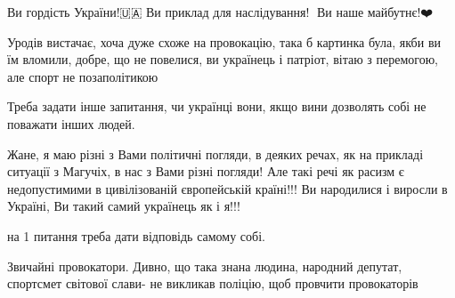 \begin{itemize}
Ви гордість України!🇺🇦 Ви приклад для наслідування!🙏 Ви наше майбутнє!❤️


 

Уродів вистачає, хоча дуже схоже на провокацію, така б картинка була, якби ви
їм вломили, добре, що не повелися, ви українець і патріот, вітаю з перемогою,
але спорт не позаполітикою


 
Треба задати інше запитання, чи українці вони, якщо вини дозволять собі не поважати інших людей.

 

Жане, я маю різні з Вами політичні погляди, в деяких речах, як на прикладі
ситуації з Магучіх, в нас з Вами різні погляди! Але такі речі як расизм є
недопустимими в цивілізованій європейській країні!!! Ви народилися і виросли в
Україні, Ви такий самий українець як і я!!!


 
на 1 питання треба дати відповідь самому собі.

 

Звичайні провокатори. Дивно, що така знана людина, народний депутат, спортсмет
світової слави- не викликав поліцію, щоб провчити провокаторів


 

\end{itemize}
